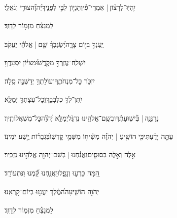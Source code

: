 \documentclass[12pt]{article}
\newcommand{\loc}[1]{\textsuperscript{\locf{#1}}}
\begin{document}
{\loc{ טו}~}‏יִ֥הְיֽוּ־לְרָצ֨וֹן |  אִמְרֵי־פִ֡י{\hfill}וְהֶגְי֣וֹן לִבִּ֣י לְפָנֶ֑יךָ\newline\hspace*{.5em}יְ֝הֹוָ֗ה{\hfill}צוּרִ֥י וְגֹאֲלִֽי׃\par\pend
\ledpb
\pstart[\subsection*{\textcolor{red}{פרק כ}}]\label{פרק כ}
{\loc{ א}~}‏לַמְנַצֵּ֗חַ מִזְמ֥וֹר לְדָוִֽד׃\par

{\loc{ ב}~}‏יַֽעַנְךָ֣  בְּי֣וֹם צָרָ֑ה{\hfill}יְ֝שַׂגֶּבְךָ֗ שֵׁ֤ם |  אֱלֹהֵ֬י יַעֲקֹֽב׃\par

{\loc{ ג}~}‏יִשְׁלַֽח־עֶזְרְךָ֥ מִקֹּ֑דֶשׁ{\hfill}וּ֝מִצִּיּ֗וֹן יִסְעָדֶֽךָּ׃\par

{\loc{ ד}~}‏יִזְכֹּ֥ר כׇּל־מִנְחֹתֶ֑ךָ{\hfill}וְעוֹלָתְךָ֖ יְדַשְּׁנֶ֣ה סֶֽלָה׃\par

{\loc{ ה}~}‏יִֽתֶּן־לְךָ֥ כִלְבָבֶ֑ךָ{\hfill}וְֽכׇל־עֲצָתְךָ֥ יְמַלֵּֽא׃\par

{\loc{ ו}~}‏נְרַנְּנָ֤ה |  בִּ֘ישׁ֤וּעָתֶ֗ךָ{\hfill}וּבְשֵֽׁם־אֱלֹהֵ֥ינוּ נִדְגֹּ֑ל\newline\hspace*{.5em}יְמַלֵּ֥א יְ֝הֹוָ֗ה{\hfill}כׇּל־מִשְׁאֲלוֹתֶֽיךָ׃\par

{\loc{ ז}~}‏עַתָּ֤ה יָדַ֗עְתִּי{\hfill}כִּ֤י הוֹשִׁ֥יעַ | יְהֹוָ֗ה מְשִׁ֫יח֥וֹ\newline\hspace*{.5em} מִשְּׁמֵ֣י קׇדְשׁ֑וֹ{\hfill}בִּ֝גְבֻר֗וֹת יֵ֣שַׁע יְמִינֽוֹ׃\par

{\loc{ ח}~}‏אֵ֣לֶּה  וְאֵ֣לֶּה בַסּוּסִ֑ים{\hfill}וַאֲנַ֓חְנוּ |  בְּשֵׁם־יְהֹוָ֖ה אֱלֹהֵ֣ינוּ נַזְכִּֽיר׃\par

{\loc{ ט}~}‏הֵ֭מָּה כָּרְע֣וּ וְנָפָ֑לוּ{\hfill}וַאֲנַ֥חְנוּ קַּ֝֗מְנוּ וַנִּתְעוֹדָֽד׃\par

{\loc{ י}~}‏יְהֹוָ֥ה הוֹשִׁ֑יעָה{\hfill}הַ֝מֶּ֗לֶךְ יַעֲנֵ֥נוּ בְיוֹם־קׇרְאֵֽנוּ׃\par\pend
\ledpb
\pstart[\subsection*{\textcolor{red}{פרק כא}}]\label{פרק כא}
{\loc{ א}~}‏לַמְנַצֵּ֗חַ מִזְמ֥וֹר לְדָוִֽד׃\par
\end{document}
